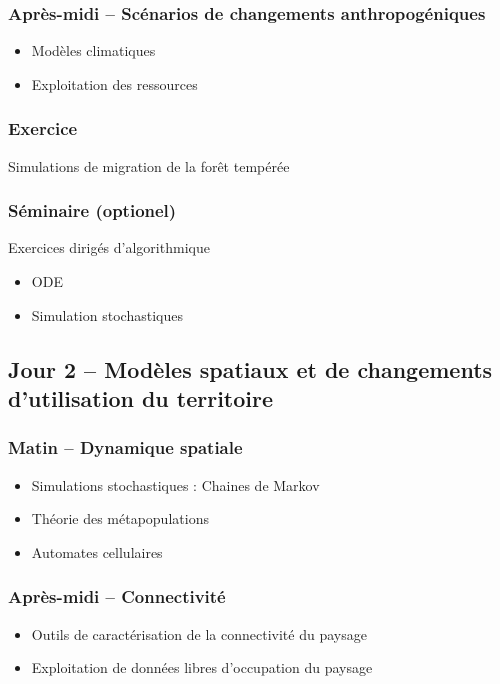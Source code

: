 \documentclass[12]{article}
\begin{document}
  \subsubsection*{Après-midi -- Scénarios de changements anthropogéniques}
  \begin{itemize}
    \item Modèles climatiques
    \item Exploitation des ressources
  \end{itemize}
  \subsubsection*{Exercice}
  Simulations de migration de la forêt tempérée

  \subsubsection*{Séminaire (optionel)}
  Exercices dirigés d'algorithmique
  \begin{itemize}
    \item ODE
    \item Simulation stochastiques
  \end{itemize}

  \subsection*{Jour 2 -- Modèles spatiaux et de changements d'utilisation du territoire}
  \subsubsection*{Matin -- Dynamique spatiale}
  \begin{itemize}
    \item Simulations stochastiques : Chaines de Markov
    \item Théorie des métapopulations
    \item Automates cellulaires
  \end{itemize}

  \subsubsection*{Après-midi -- Connectivité}
  \begin{itemize}
    \item Outils de caractérisation de la connectivité du paysage
    \item Exploitation de données libres d'occupation du paysage
  \end{itemize}
\end{document}

